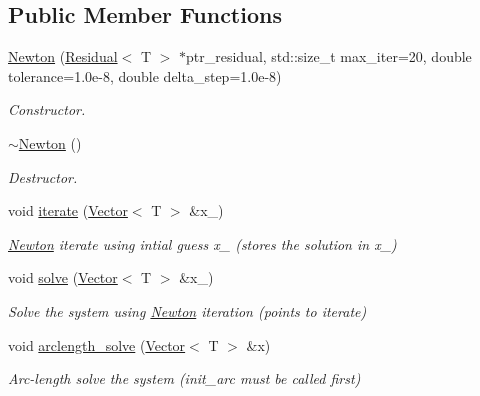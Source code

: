 \subsection*{Public Member Functions}
\begin{DoxyCompactItemize}
\item 
\hyperlink{classLuna_1_1Newton_a062c2b36d5e7d345173c0b2b525b3f9d}{Newton} (\hyperlink{classLuna_1_1Residual}{Residual}$<$ T $>$ $\ast$ptr\+\_\+residual, std\+::size\+\_\+t max\+\_\+iter=20, double tolerance=1.\+0e-\/8, double delta\+\_\+step=1.\+0e-\/8)
\begin{DoxyCompactList}\small\item\em Constructor. \end{DoxyCompactList}\item 
\hyperlink{classLuna_1_1Newton_ad714e7ff295362a3e89bf3cff26dc2da}{$\sim$\+Newton} ()
\begin{DoxyCompactList}\small\item\em Destructor. \end{DoxyCompactList}\item 
void \hyperlink{classLuna_1_1Newton_a3de816dba7a950702b6f93fc710d4f03}{iterate} (\hyperlink{classLuna_1_1Vector}{Vector}$<$ T $>$ \&x\+\_)
\begin{DoxyCompactList}\small\item\em \hyperlink{classLuna_1_1Newton}{Newton} iterate using intial guess x\+\_ (stores the solution in x\+\_) \end{DoxyCompactList}\item 
void \hyperlink{classLuna_1_1Newton_a1d5ebdbfd8910c40ed58244f6348b13e}{solve} (\hyperlink{classLuna_1_1Vector}{Vector}$<$ T $>$ \&x\+\_)
\begin{DoxyCompactList}\small\item\em Solve the system using \hyperlink{classLuna_1_1Newton}{Newton} iteration (points to iterate) \end{DoxyCompactList}\item 
void \hyperlink{classLuna_1_1Newton_ac300f6b5744bf66fd2f385c678d24dcf}{arclength\+\_\+solve} (\hyperlink{classLuna_1_1Vector}{Vector}$<$ T $>$ \&x)
\begin{DoxyCompactList}\small\item\em Arc-\/length solve the system (init\+\_\+arc must be called first) \end{DoxyCompactList}\end{DoxyCompactItemize}
